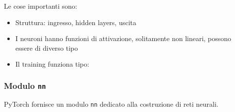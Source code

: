 Le cose importanti sono: 
\begin{itemize}
    \item Struttura: ingresso, hidden layers, uscita
    
    \item I neuroni hanno funzioni di attivazione, solitamente non lineari, possono essere di diverso tipo
    
    \item Il training funziona tipo:
    \begin{center}
        \begin{minipage}{.9\textwidth}
            \begin{tcolorbox}[
                colback=white,
                sharp corners,
                boxrule=.3mm,
                left=20pt,
                top=0pt,
                bottom=0pt,
                colbacktitle=white,
                coltitle=black
                ]
                \LinesNumbered
                \begin{algorithm}[H]
                    \SetAlgoNoEnd
                \end{algorithm}
            \end{tcolorbox}
        \end{minipage}
    \end{center}
\end{itemize}

\subsubsection{Modulo \texttt{nn}}

PyTorch fornisce un modulo \texttt{nn} dedicato alla costruzione di reti neurali.

